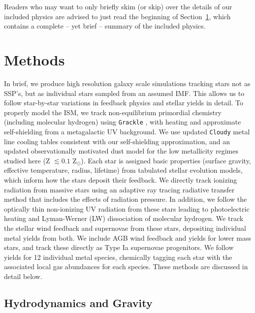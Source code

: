 \documentclass[twocolumn]{aastex61}
\begin{document}
Readers who may want to only briefly skim (or skip) over the details of our included physics are advised to just read the beginning of Section~\ref{sec:methods}, which contains a complete -- yet brief -- summary of the included physics.

\section{Methods}
\label{sec:methods}
In brief, we produce high resolution galaxy scale simulations tracking stars not as SSP's, but as individual stars sampled from an assumed IMF.
This allows us to follow star-by-star variations in feedback physics and stellar yields in detail. To properly model the ISM, we track non-equilibrium primordial chemistry (including molecular hydrogen) using \texttt{Grackle} \citep{GrackleMethod}, with heating and approximate self-shielding from a metagalactic UV background. We use updated \texttt{Cloudy} metal line cooling tables consistent with our self-shielding approximation, and an updated observationally motivated dust model for the low metallicity regimes studied here (Z $\lesssim 0.1$ Z$_{\odot}$). Each star is assigned basic properties (surface gravity, effective temperature, radius, lifetime) from tabulated stellar evolution models, which inform how the stars deposit their feedback. We directly track ionizing radiation from massive stars using an adaptive ray tracing radiative transfer method that includes the effects of radiation pressure. In addition, we follow the optically thin non-ionizing UV radiation from these stars leading to photoelectric heating and Lyman-Werner (LW) dissociation of molecular hydrogen. We track the stellar wind feedback and supernovae from these stars, depositing individual metal yields from both. We include AGB wind feedback and yields for lower mass stars, and track these directly as Type Ia supernovae progenitors. We follow yields for 12 individual metal species, chemically tagging each star with the associated local gas abundances for each species. These methods are discussed in detail below.

\subsection{Hydrodynamics and Gravity}
\end{document}
